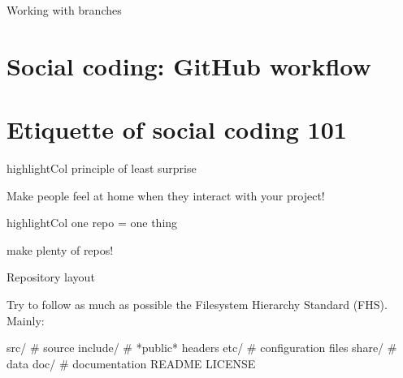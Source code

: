 \documentclass[compress]{beamer}
\newcommand{\highlight}[1]{%
    \vspace{1em}%
    \begin{beamercolorbox}[wd=\linewidth,ht=2ex,dp=0.7ex]{highlightCol}%
    \centering #1%
    \end{beamercolorbox}%
    \vspace{1em}%
}%
\begin{document}
\begin{frame}{Working with branches}
\end{frame}

\section{Social coding: GitHub workflow}


\section{Etiquette of social coding 101}

\begin{frame}{}
    \centering

    \highlight{\Medium principle of least surprise}

    Make people feel at home when they interact with your project!

\end{frame}

\begin{frame}{}
    \centering
    \highlight{one repo = one thing}

    make plenty of repos!
\end{frame}

\begin{frame}[fragile]{Repository layout}

Try to follow as much as possible the {\Medium Filesystem Hierarchy
 Standard} (FHS). Mainly:

\begin{shcode}
src/        # source
include/    # *public* headers
etc/        # configuration files
share/      # data
doc/        # documentation
README
LICENSE
\end{shcode}

\centering


\end{frame}
\end{document}

